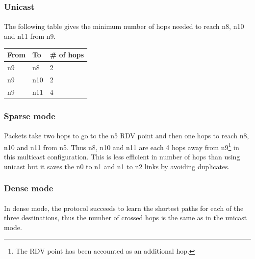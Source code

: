 \documentclass[a4paper]{article}
\begin{document}
   \subsubsection{Unicast}

    \paragraph{}The following table gives the minimum number of hops needed to
reach n8, n10 and n11 from n9.

    \begin{center}
            \begin{tabular}{|l|l|l|}
                \hline
                From & To & \# of hops \\
                \hline
                n9 & n8  & 2 \\
                n9 & n10 & 2 \\
                n9 & n11 & 4 \\
                \hline
            \end{tabular}
    \end{center}

   \subsubsection{Sparse mode}

    \paragraph{}Packets take two hops to go to the n5 RDV point and then one
hops to reach n8, n10 and n11 from n5. Thus n8, n10 and n11 are each 4 hops
away from n9\footnote{The RDV point has been accounted as an additional hop.} in
this multicast configuration. This is less efficient in number of hops than
using unicast but it saves the n0 to n1 and n1 to n2 links by avoiding
duplicates.

   \subsubsection{Dense mode}

    \paragraph{}In dense mode, the protocol succeeds to learn the shortest
paths for each of the three destinations, thus the number of crossed hops is
the same as in the unicast mode.
\end{document}
